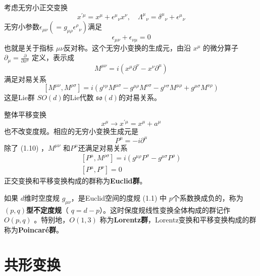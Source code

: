 考虑无穷小正交变换
\begin{equation}
x^{\prime \mu}=x^{\mu}+\epsilon^{\mu}{}_{\nu} x^{\nu}, \quad \Lambda^{\mu}{}_{\nu}=\delta^{\mu}{}_{\nu}+\epsilon^{\mu}{}_{\nu}
\end{equation}
无穷小参数$ \epsilon_{\mu \nu}\left(=g_{\mu \rho} \epsilon^{\rho}{}_{\nu}\right) $满足
\begin{equation}
		\epsilon_{\mu \nu}+\epsilon_{\nu \mu}=0
\end{equation}
也就是关于指标 $\mu\nu $反对称。这个无穷小变换的生成元，由沿 $x^\mu$ 的微分算子 $\partial_{\mu}=\frac{\partial}{\partial x^{\mu}}$ 定义，表示成
\begin{equation}
		M^{\mu \nu}=i\left(x^{\mu} \partial^{\nu}-x^{\nu} \partial^{\mu}\right)
\end{equation}
满足对易关系
\begin{equation}
		\left[M^{\mu \nu}, M^{\rho \sigma}\right]=i\left(g^{\nu \rho} M^{\mu \sigma}-g^{\mu \rho} M^{\nu \sigma}-g^{\nu \sigma} M^{\mu \rho}+g^{\mu \sigma} M^{\nu \rho}\right)
\end{equation}
这是Lie群 $SO(d) $的Lie代数 $\mathfrak{so}(d) $的对易关系。

整体平移变换
\begin{equation}
	x^{\mu} \rightarrow x^{\prime \mu}=x^{\mu}+a^{\mu}
\end{equation}
也不改变度规。相应的无穷小变换生成元是
\begin{equation}
	P^{\mu}=-i \partial^{\mu}
\end{equation}
除了 (1.10) ，$M^{\mu\nu}$ 和$ P^\mu $还满足对易关系
\begin{equation}
	\begin{array}{l} {\left[P^{\mu}, M^{\rho \sigma}\right]=i\left(g^{\mu \rho} P^{\sigma}-g^{\mu \sigma} P^{\rho}\right)} \\ {\left[P^{\mu}, P^{\nu}\right]=0} \end{array}
\end{equation}
正交变换和平移变换构成的群称为\textbf{Euclid群}。

如果 $d $维时空度规 $g_{\mu\nu} $，是Euclid空间的度规 (1.1) 中 $p $个系数换成负的，称为\textbf{ $(p,q) $型不定度规}（ $q=d-p $）。这时保度规线性变换全体构成的群记作 $O(p,q)$ 。特别地，$ O(1,3)$ 称为\textbf{Lorentz群}，Lorentz变换和平移变换构成的群称为\textbf{Poincaré群}。

\section{共形变换}

